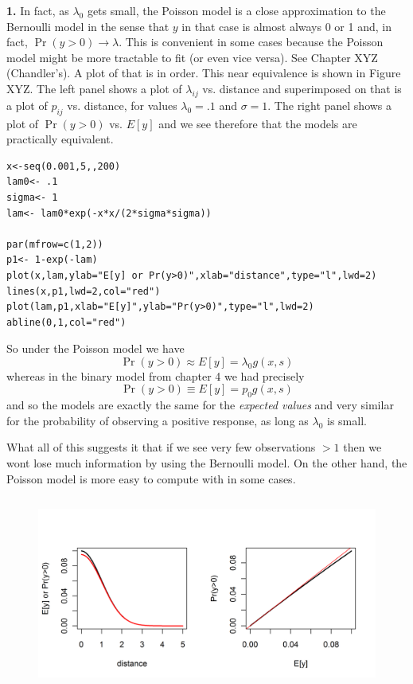 {\bf 1.} In fact, as $\lambda_0$ gets small, the Poisson model is a close approximation
to the Bernoulli model in the sense that $y$ in that case is almost
always 0 or 1 and, in fact, $\Pr(y>0) \rightarrow \lambda$.  This is
convenient in some cases because the Poisson model might be more
tractable to fit (or even vice versa). See Chapter XYZ (Chandler’s).
A plot of that is in order. This near equivalence is shown in  Figure
XYZ. The left panel shows a plot of $\lambda_{ij}$ vs. distance and
superimposed on that is a plot of $p_{ij}$ vs. distance, for values
$\lambda_{0} = .1$ and $\sigma = 1$. The right panel shows a plot of
$\Pr(y>0)$ vs. $E[y]$ and we see therefore that the models are
practically equivalent. 

\begin{verbatim}
x<-seq(0.001,5,,200)
lam0<- .1
sigma<- 1
lam<- lam0*exp(-x*x/(2*sigma*sigma))

par(mfrow=c(1,2))
p1<- 1-exp(-lam)
plot(x,lam,ylab="E[y] or Pr(y>0)",xlab="distance",type="l",lwd=2)
lines(x,p1,lwd=2,col="red")
plot(lam,p1,xlab="E[y]",ylab="Pr(y>0)",type="l",lwd=2)
abline(0,1,col="red")
\end{verbatim}

So under the Poisson model we have
\[
\Pr(y>0) \approx E[y] = \lambda_{0} g(x,s)
\]
whereas in the binary model from chapter 4 we had precisely
\[
\Pr(y>0) \equiv E[y] = p_{0} g(x,s)
\]
and so the models are exactly the same for the {\it expected values}
and very similar for the probability of observing a positive response,
as long as $\lambda_{0}$ is small.


What all of this suggests it that
if we see very few observations $>1$ then we wont lose much
information by using the Bernoulli model. On the other hand, the
Poisson model is more easy to compute with in some cases. 


\begin{figure}
\centering
\includegraphics[width=5in,height=2.5in]{Ch5/figs/Poisson-Bern.png}
\label{fig:elevMap}
\end{figure}



